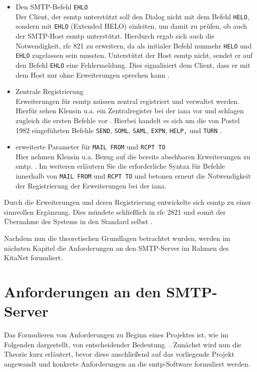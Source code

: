 \begin{itemize}
	\item{Den SMTP-Befehl \verb+EHLO+}\\
	Der Client, der \ac{esmtp} unterstützt soll den Dialog nicht mit dem Befehl \verb+HELO+, sondern mit \verb+EHLO+ (Extended HELO) einleiten, um damit zu prüfen, ob auch der SMTP-Host \ac{esmtp} unterstützt. Hierdurch ergab sich auch die Notwendigkeit, \ac{rfc} 821 zu erweitern, da als initialer Befehl nunmehr \verb+HELO+ und \verb+EHLO+ zugelassen sein mussten. Unterstützt der Host \ac{esmtp} nicht, sendet er auf den Befehl \verb+EHLO+ eine Fehlermeldung. Dies signalisiert dem Client, dass er mit dem Host nur ohne Erweiterungen sprechen kann \citep[vgl.][S. 3 ff.]{rfc1869}.
	\item{Zentrale Registrierung}\\
	Erweiterungen für \ac{esmtp} müssen zentral registriert und verwaltet werden. Hierfür sehen Klensin u.a. ein Zentralregister bei der \ac{iana} vor und schlagen zugleich die ersten Befehle vor \citep[vgl.][7]{rfc1869}. Hierbei handelt es sich um die von Postel 1982 eingeführten Befehle \verb+SEND+, \verb+SOML+, \verb+SAML+, \verb+EXPN+, \verb+HELP,+ und \verb+TURN+ \citep[für die Befehle vgl.][S. 23 ff.]{rfc821}.
	\item{erweiterte Parameter für \verb+MAIL FROM+ und \verb+RCPT TO+}\\
	Hier nehmen Klensin u.a. Bezug auf die bereits absehbaren Erweiterungen zu \ac{smtp}.  \citep[][7]{rfc1869}. Im weiteren erläutern Sie die erforderliche Syntax für Befehle innerhalb von \verb+MAIL FROM+ und \verb+RCPT TO+ und betonen erneut die Notwendigkeit der Registrierung der Erweiterungen bei der \ac{iana}.
\end{itemize}

Durch die Erweiterungen und deren Registrierung entwickelte sich \ac{esmtp} zu einer sinnvollen Ergänzung. Dies mündete schließlich in \ac{rfc} 2821 und somit der Übernahme des Systems in den Standard selbst \citep[vgl. u.a.][S. 7 ff]{rfc2821}.

Nachdem nun die theoretischen Grundlagen betrachtet wurden, werden im nächsten Kapitel die Anforderungen an den SMTP-Server im Rahmen des KitaNet formuliert. 





\chapter{Anforderungen an den SMTP-Server}
\label{sec:Anforderung}
Das Formulieren von Anforderungen zu Beginn eines Projektes ist, wie im Folgenden dargestellt, von entscheidender Bedeutung.  \citep[][77]{Hull2010}. Zunächst wird nun die Theorie kurz erläutert, bevor diese anschließend auf das vorliegende Projekt angewandt und konkrete Anforderungen an die \ac{smtp}-Software formuliert werden.

